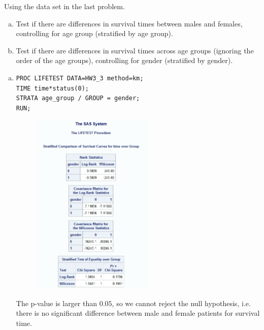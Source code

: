 \documentclass[12pt]{elegantbook}
\begin{document}
    \begin{exercise*}[4]
        Using the data set in the last problem. 
        \begin{enumerate}[(a)]
            \item Test if there are differences in survival times between males and females, controlling for age group (stratified by age group). 
            \item Test if there are differences in survival times across age groups (ignoring the order of the age groups), controlling for gender (stratified by gender).
        \end{enumerate}
    \end{exercise*}
    \begin{solution}
        \begin{enumerate}[(a)]
            \item \begin{verbatim}
PROC LIFETEST DATA=HW3_3 method=km; 
TIME time*status(0); 
STRATA age_group / GROUP = gender; 
RUN; 
            \end{verbatim}
            \begin{figure}[H]
                \centering
                \includegraphics[width=0.55\textwidth]{HW3_4a.png}
            \end{figure}
            The p-value is larger than $0.05$, so we cannot reject the null hypothesis, i.e. there is no significant difference between male and female patients for survival time. 

\end{enumerate}
\end{solution}
\end{document}
